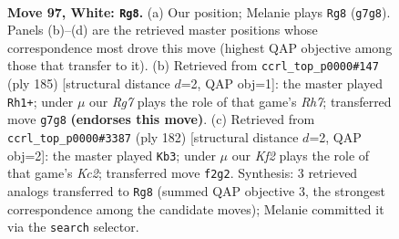 \documentclass[11pt]{article}
\begin{document}
\begin{figure}[p]\centering
\begin{subfigure}{0.46\textwidth}\centering
\resizebox{\linewidth}{!}{%
\newchessgame
\chessboard[
  setfen={8/6R1/1k6/8/7r/8/5K2/r7 w - - 4 97},
  showmover=false,
  pgfstyle=straightmove, color=movearrow, markmove={g7-g8}
]}
\caption{}
\end{subfigure}\hfill
\begin{subfigure}{0.46\textwidth}\centering
\resizebox{\linewidth}{!}{%
\newchessgame
\chessboard[
  setfen={1k6/8/8/8/8/2R5/7r/3K4 b - - 17 93},
  showmover=false,
  pgfstyle=straightmove, color=movearrow, markmove={h2-h1}
]}
\caption{}
\end{subfigure}
\\[4pt]
\begin{subfigure}{0.46\textwidth}\centering
\resizebox{\linewidth}{!}{%
\newchessgame
\chessboard[
  setfen={1R6/r7/3r4/8/7R/8/2K3k1/8 w - - 18 92},
  showmover=false,
  pgfstyle=straightmove, color=movearrow, markmove={c2-b3}
]}
\caption{}
\end{subfigure}\hfill

\caption{\textbf{Move 97, White: \texttt{Rg8}.} (a) Our position; Melanie plays \texttt{Rg8} (\texttt{g7g8}). Panels (b)--(d) are the retrieved master positions whose correspondence most drove this move (highest QAP objective among those that transfer to it). (b) Retrieved from \texttt{ccrl\_top\_p0000\#147} (ply 185) [structural distance $d$=2, QAP obj=1]: the master played \texttt{Rh1+}; under $\mu$ our \emph{Rg7} plays the role of that game's \emph{Rh7}; transferred move \texttt{g7g8} \textbf{(endorses this move)}. (c) Retrieved from \texttt{ccrl\_top\_p0000\#3387} (ply 182) [structural distance $d$=2, QAP obj=2]: the master played \texttt{Kb3}; under $\mu$ our \emph{Kf2} plays the role of that game's \emph{Kc2}; transferred move \texttt{f2g2}. Synthesis: 3 retrieved analogs transferred to \texttt{Rg8} (summed QAP objective 3, the strongest correspondence among the candidate moves); Melanie committed it via the \texttt{search} selector.}
\label{fig:thought-m192}
\end{figure}

\clearpage
\end{document}
